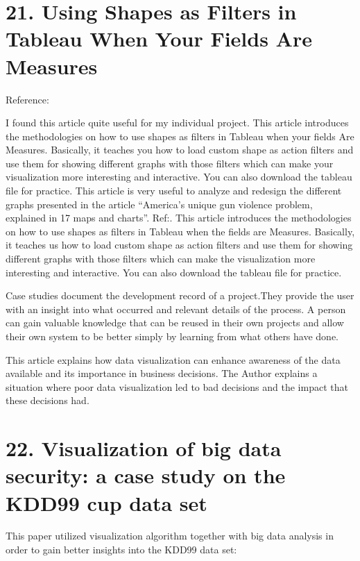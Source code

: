 \documentclass[]{book}
\theoremstyle{definition}
\theoremstyle{definition}
\theoremstyle{definition}
\theoremstyle{remark}
\begin{document}
\section{21. Using Shapes as Filters in Tableau When Your Fields Are
Measures}\label{using-shapes-as-filters-in-tableau-when-your-fields-are-measures-1}

Reference: \citep{interworks}

I found this article quite useful for my individual project. This
article introduces the methodologies on how to use shapes as filters in
Tableau when your fields Are Measures. Basically, it teaches you how to
load custom shape as action filters and use them for showing different
graphs with those filters which can make your visualization more
interesting and interactive. You can also download the tableau file for
practice. This article is very useful to analyze and redesign the
different graphs presented in the article ``America's unique gun
violence problem, explained in 17 maps and charts''.
Ref:\citep{gunviolence}. This article introduces the methodologies on
how to use shapes as filters in Tableau when the fields are Measures.
Basically, it teaches us how to load custom shape as action filters and
use them for showing different graphs with those filters which can make
the visualization more interesting and interactive. You can also
download the tableau file for practice.

Case studies document the development record of a project.They provide
the user with an insight into what occurred and relevant details of the
process. A person can gain valuable knowledge that can be reused in
their own projects and allow their own system to be better simply by
learning from what others have done.

This article explains how data visualization can enhance awareness of
the data available and its importance in business decisions. The Author
explains a situation where poor data visualization led to bad decisions
and the impact that these decisions had.

\section{22. Visualization of big data security: a case study on the
KDD99 cup data
set}\label{visualization-of-big-data-security-a-case-study-on-the-kdd99-cup-data-set}

This paper utilized visualization algorithm together with big data
analysis in order to gain better insights into the KDD99 data set:
\end{document}
